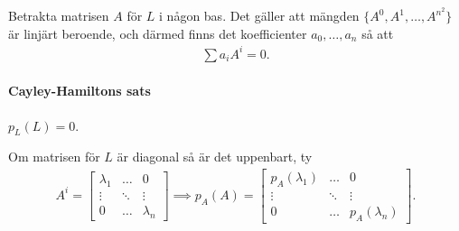\proof
Betrakta matrisen $A$ för $L$ i någon bas. Det gäller att mängden $\{A^{0}, A^{1}, \dots, A^{n^2}\}$ är linjärt beroende, och därmed finns det koefficienter $a_{0}, \dots, a_{n}$ så att
\begin{align*}
	\sum a_{i}A^{i} = 0.
\end{align*}

\paragraph{Cayley-Hamiltons sats}
$p_{L}(L) = 0$.

\proof
Om matrisen för $L$ är diagonal så är det uppenbart, ty
\begin{align*}
	A^{i} =
	\left[\begin{array}{ccc}
		\lambda_{1} & \dots  & 0 \\
		\vdots      & \ddots & \vdots \\
		0           & \dots  & \lambda_{n}
	\end{array}\right]
	\implies
	p_{A}(A) =
	\left[\begin{array}{ccc}
		p_{A}(\lambda_{1}) & \dots  & 0 \\
		\vdots             & \ddots & \vdots \\
		0                  & \dots  & p_{A}(\lambda_{n})
	\end{array}\right].
\end{align*}